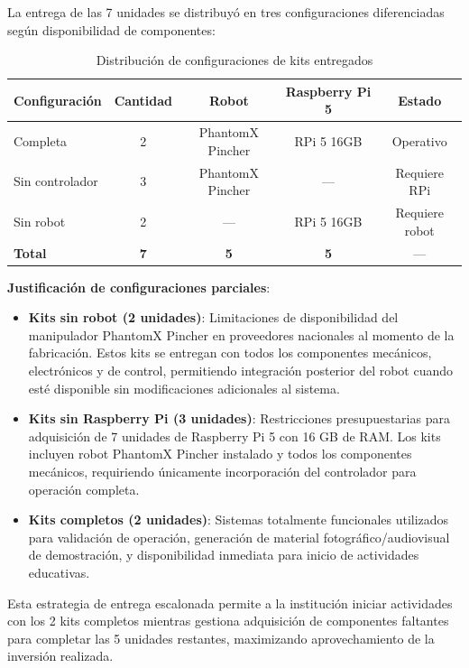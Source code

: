 La entrega de las 7 unidades se distribuyó en tres configuraciones diferenciadas según disponibilidad de componentes:

\begin{table}[H]
\centering
\caption{Distribución de configuraciones de kits entregados}
\label{tab:kits_entregados}
\begin{tabular}{|l|c|c|c|c|}
\hline
\textbf{Configuración} & \textbf{Cantidad} & \textbf{Robot} & \textbf{Raspberry Pi 5} & \textbf{Estado} \\
\hline
Completa & 2 & PhantomX Pincher & RPi 5 16GB & Operativo \\
\hline
Sin controlador & 3 & PhantomX Pincher & --- & Requiere RPi \\
\hline
Sin robot & 2 & --- & RPi 5 16GB & Requiere robot \\
\hline
\textbf{Total} & \textbf{7} & \textbf{5} & \textbf{5} & --- \\
\hline
\end{tabular}
\end{table}

\textbf{Justificación de configuraciones parciales}:

\begin{itemize}
    \item \textbf{Kits sin robot (2 unidades)}: Limitaciones de disponibilidad del manipulador PhantomX Pincher en proveedores nacionales al momento de la fabricación. Estos kits se entregan con todos los componentes mecánicos, electrónicos y de control, permitiendo integración posterior del robot cuando esté disponible sin modificaciones adicionales al sistema.
    
    \item \textbf{Kits sin Raspberry Pi (3 unidades)}: Restricciones presupuestarias para adquisición de 7 unidades de Raspberry Pi 5 con 16 GB de RAM. Los kits incluyen robot PhantomX Pincher instalado y todos los componentes mecánicos, requiriendo únicamente incorporación del controlador para operación completa.
    
    \item \textbf{Kits completos (2 unidades)}: Sistemas totalmente funcionales utilizados para validación de operación, generación de material fotográfico/audiovisual de demostración, y disponibilidad inmediata para inicio de actividades educativas.
\end{itemize}

Esta estrategia de entrega escalonada permite a la institución iniciar actividades con los 2 kits completos mientras gestiona adquisición de componentes faltantes para completar las 5 unidades restantes, maximizando aprovechamiento de la inversión realizada.

